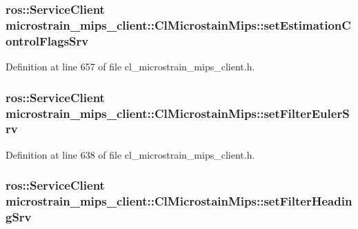 \subsubsection[{\texorpdfstring{set\+Estimation\+Control\+Flags\+Srv}{setEstimationControlFlagsSrv}}]{\setlength{\rightskip}{0pt plus 5cm}ros\+::\+Service\+Client microstrain\+\_\+mips\+\_\+client\+::\+Cl\+Microstain\+Mips\+::set\+Estimation\+Control\+Flags\+Srv\hspace{0.3cm}{\ttfamily [protected]}}\hypertarget{classmicrostrain__mips__client_1_1ClMicrostainMips_a13132b27dff7c8527c42e91dc7dccb39}{}\label{classmicrostrain__mips__client_1_1ClMicrostainMips_a13132b27dff7c8527c42e91dc7dccb39}


Definition at line 657 of file cl\+\_\+microstrain\+\_\+mips\+\_\+client.\+h.

\subsubsection[{\texorpdfstring{set\+Filter\+Euler\+Srv}{setFilterEulerSrv}}]{\setlength{\rightskip}{0pt plus 5cm}ros\+::\+Service\+Client microstrain\+\_\+mips\+\_\+client\+::\+Cl\+Microstain\+Mips\+::set\+Filter\+Euler\+Srv\hspace{0.3cm}{\ttfamily [protected]}}\hypertarget{classmicrostrain__mips__client_1_1ClMicrostainMips_ac6dd19db8020f5006b362cfc2196138c}{}\label{classmicrostrain__mips__client_1_1ClMicrostainMips_ac6dd19db8020f5006b362cfc2196138c}


Definition at line 638 of file cl\+\_\+microstrain\+\_\+mips\+\_\+client.\+h.

\subsubsection[{\texorpdfstring{set\+Filter\+Heading\+Srv}{setFilterHeadingSrv}}]{\setlength{\rightskip}{0pt plus 5cm}ros\+::\+Service\+Client microstrain\+\_\+mips\+\_\+client\+::\+Cl\+Microstain\+Mips\+::set\+Filter\+Heading\+Srv\hspace{0.3cm}{\ttfamily [protected]}}\hypertarget{classmicrostrain__mips__client_1_1ClMicrostainMips_aa83a0e93c3f31acb10044f01036bda75}{}\label{classmicrostrain__mips__client_1_1ClMicrostainMips_aa83a0e93c3f31acb10044f01036bda75}


